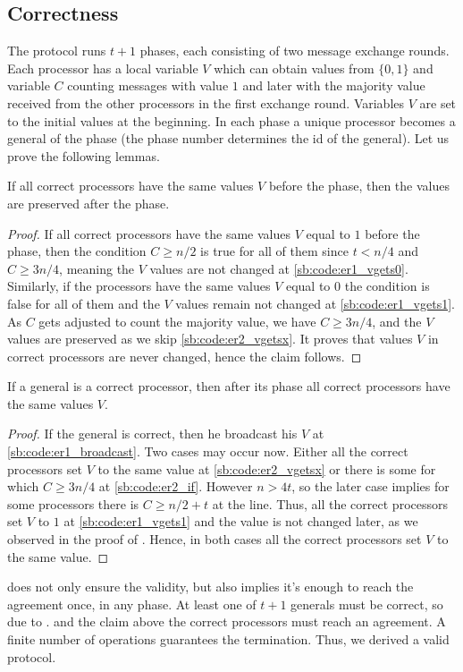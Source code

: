 \subsection{Correctness}
The protocol runs $t+1$ phases, each consisting of two message exchange rounds. Each processor has a local variable $V$ which can obtain values from $\{0,1\}$ and variable $C$ counting messages with value $1$ and later with the majority value received from the other processors in the first exchange round. Variables $V$ are set to the initial values at the beginning. In each phase a unique processor becomes a general of the phase (the phase number determines the id of the general). Let us prove the following lemmas.
\begin{lemma}\label{sb:lem:preserve}
If all correct processors have the same values $V$ before the phase, then the values are preserved after the phase.
\end{lemma}
\begin{proof} 
If all correct processors have the same values $V$ equal to $1$ before the phase, then the condition $C\geq n/2$ is true for all of them since $t<n/4$ and $C\geq 3n/4$, meaning the $V$ values are not changed at \cref{sb:code:er1_vgets0}. Similarly, if the processors have the same values $V$ equal to $0$ the condition is false for all of them and the $V$ values remain not changed at \cref{sb:code:er1_vgets1}. As $C$ gets adjusted to count the majority value, we have $C\geq 3n/4$, and the $V$ values are preserved as we skip \cref{sb:code:er2_vgetsx}. It proves that values $V$ in correct processors are never changed, hence the claim follows.
\end{proof}
\begin{lemma} \label{sb:lem:general}
If a general is a correct processor, then after its phase all correct processors have the same values $V$.
\end{lemma}
\begin{proof}
If the general is correct, then he broadcast his $V$ at \cref{sb:code:er1_broadcast}. Two cases may occur now. Either all the correct processors set $V$ to the same value at \cref{sb:code:er2_vgetsx} or there is some for which $C\geq 3n/4$ at \cref{sb:code:er2_if}. However $n>4t$, so the later case implies for some processors there is $C \geq n/2 + t$ at the line. Thus, all the correct processors set $V$ to $1$ at \cref{sb:code:er1_vgets1} and the value is not changed later, as we observed in the proof of . 
Hence, in both cases all the correct processors set $V$ to the same value.
\end{proof}
 does not only ensure the validity, but also implies it's enough to reach the agreement once, in any phase. At least one of $t+1$ generals must be correct, so due to . and the claim above the correct processors must reach an agreement. A finite number of operations guarantees the termination. Thus, we derived a valid protocol.

